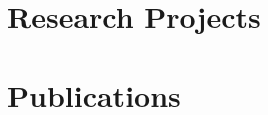 \documentclass[11pt,fleqn]{book} %
\begin{document}

\chapter{Research Projects}
\newpage



\chapter{Publications}

\end{document}
